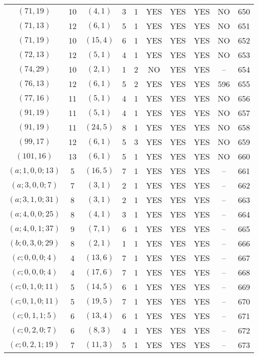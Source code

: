 \begin{longtable}{|c|c|c|c|c|c|c|c|c|c|}
$(71, 19)$ & 10 & $(4, 1)$ & 3 & 1 & YES & YES & YES & NO & 650\\
$(71, 13)$ & 12 & $(6, 1)$ & 5 & 1 & YES & YES & YES & NO & 651\\
$(71, 19)$ & 10 & $(15, 4)$ & 6 & 1 & YES & YES & YES & NO & 652\\
$(72, 13)$ & 12 & $(5, 1)$ & 4 & 1 & YES & YES & YES & NO & 653\\
$(74, 29)$ & 10 & $(2, 1)$ & 1 & 2 & NO & YES & YES & -- & 654\\
$(76, 13)$ & 12 & $(6, 1)$ & 5 & 2 & YES & YES & YES & 596 & 655\\
$(77, 16)$ & 11 & $(5, 1)$ & 4 & 1 & YES & YES & YES & NO & 656\\
$(91, 19)$ & 11 & $(5, 1)$ & 4 & 1 & YES & YES & YES & NO & 657\\
$(91, 19)$ & 11 & $(24, 5)$ & 8 & 1 & YES & YES & YES & NO & 658\\
$(99, 17)$ & 12 & $(6, 1)$ & 5 & 3 & YES & YES & YES & NO & 659\\
$(101, 16)$ & 13 & $(6, 1)$ & 5 & 1 & YES & YES & YES & NO & 660\\
$(a; 1, 0, 0; 13)$ & 5 & $(16, 5)$ & 7 & 1 & YES & YES & YES & -- & 661\\
$(a; 3, 0, 0; 7)$ & 7 & $(3, 1)$ & 2 & 1 & YES & YES & YES & -- & 662\\
$(a; 3, 1, 0; 31)$ & 8 & $(3, 1)$ & 2 & 1 & YES & YES & YES & -- & 663\\
$(a; 4, 0, 0; 25)$ & 8 & $(4, 1)$ & 3 & 1 & YES & YES & YES & -- & 664\\
$(a; 4, 0, 1; 37)$ & 9 & $(7, 1)$ & 6 & 1 & YES & YES & YES & -- & 665\\
$(b; 0, 3, 0; 29)$ & 8 & $(2, 1)$ & 1 & 1 & YES & YES & YES & -- & 666\\
$(c; 0, 0, 0; 4)$ & 4 & $(13, 6)$ & 7 & 1 & YES & YES & YES & -- & 667\\
$(c; 0, 0, 0; 4)$ & 4 & $(17, 6)$ & 7 & 1 & YES & YES & YES & -- & 668\\
$(c; 0, 1, 0; 11)$ & 5 & $(14, 5)$ & 6 & 1 & YES & YES & YES & -- & 669\\
$(c; 0, 1, 0; 11)$ & 5 & $(19, 5)$ & 7 & 1 & YES & YES & YES & -- & 670\\
$(c; 0, 1, 1; 5)$ & 6 & $(13, 4)$ & 6 & 1 & YES & YES & YES & -- & 671\\
$(c; 0, 2, 0; 7)$ & 6 & $(8, 3)$ & 4 & 1 & YES & YES & YES & -- & 672\\
$(c; 0, 2, 1; 19)$ & 7 & $(11, 3)$ & 5 & 1 & YES & YES & YES & -- & 673\\

\end{longtable}
